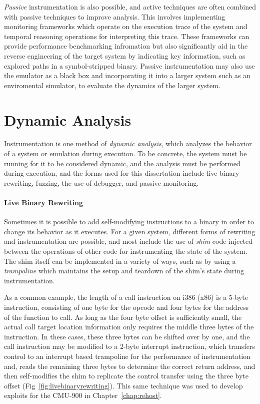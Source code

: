 \emph{Passive} instrumentation is also possible, and active techniques are often combined with passive techniques to improve analysis.
This involves implementing monitoring frameworks which operate on the execution trace of the system and temporal reasoning operations for interpreting this trace.
These frameworks can provide performance benchmarking infromation but also significantly aid in the reverse engineering of the target system by indicating key information, such as explored paths in a symbol-stripped binary.
Passive instrumentation may also use the emulator as a black box and incorporating it into a larger system such as an enviromental simulator, to evaluate the dynamics of the larger system.

\section{Dynamic Analysis}
\label{sec:dynanal}

Instrumentation is one method of \emph{dynamic analysis}, which analyzes the behavior of a system or emulation during execution.
To be concrete, the system must be running for it to be considered dynamic, and the analysis must be performed during execution, and the forms used for this dissertation include live binary rewriting, fuzzing, the use of debugger, and passive monitoring.

\paragraph{Live Binary Rewriting} Sometimes it is possible to add self-modifying instructions to a binary in order to change its behavior as it executes.
For a given system, different forms of rewriting and instrumentation are possible, and most include the use of \emph{shim} code injected between the operations of other code for instrumenting the state of the system.
The shim itself can be implemented in a variety of ways, such as by using a \emph{trampoline} which maintains the setup and teardown of the shim's state during instrumentation.

As a common example, the length of a call instruction on i386 (x86) is a 5-byte instruction, consisting of one byte for the opcode and four bytes for the address of the function to call.
As long as the four byte offset is sufficiently small, the actual call target location information only requires the middle three bytes of the instruction.
In these cases, these three bytes can be shifted over by one, and the call instruction may be modified to a 2-byte interrupt instruction, which transfers control to an interrupt based trampoline for the performance of instrumentation and, reads the remaining three bytes to determine the correct return address, and then self-modifies the shim to replicate the control transfer using the three byte offset (Fig~\ref{fig:livebinaryrewriting}).
This same technique was used to develop exploits for the CMU-900 in Chapter~\ref{chap:rehost}.

